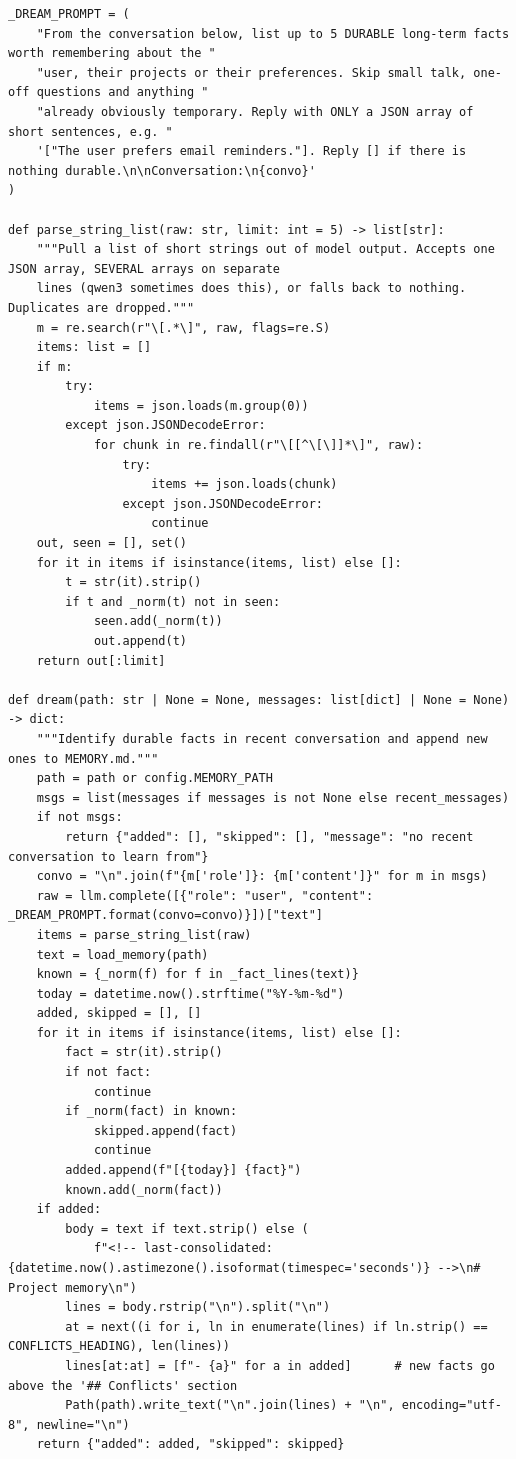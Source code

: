 \documentclass[11pt]{article}
\begin{document}
\begingroup\lstset{basicstyle=\ttfamily\scriptsize}
\begin{lstlisting}
_DREAM_PROMPT = (
    "From the conversation below, list up to 5 DURABLE long-term facts worth remembering about the "
    "user, their projects or their preferences. Skip small talk, one-off questions and anything "
    "already obviously temporary. Reply with ONLY a JSON array of short sentences, e.g. "
    '["The user prefers email reminders."]. Reply [] if there is nothing durable.\n\nConversation:\n{convo}'
)

def parse_string_list(raw: str, limit: int = 5) -> list[str]:
    """Pull a list of short strings out of model output. Accepts one JSON array, SEVERAL arrays on separate
    lines (qwen3 sometimes does this), or falls back to nothing. Duplicates are dropped."""
    m = re.search(r"\[.*\]", raw, flags=re.S)
    items: list = []
    if m:
        try:
            items = json.loads(m.group(0))
        except json.JSONDecodeError:
            for chunk in re.findall(r"\[[^\[\]]*\]", raw):
                try:
                    items += json.loads(chunk)
                except json.JSONDecodeError:
                    continue
    out, seen = [], set()
    for it in items if isinstance(items, list) else []:
        t = str(it).strip()
        if t and _norm(t) not in seen:
            seen.add(_norm(t))
            out.append(t)
    return out[:limit]

def dream(path: str | None = None, messages: list[dict] | None = None) -> dict:
    """Identify durable facts in recent conversation and append new ones to MEMORY.md."""
    path = path or config.MEMORY_PATH
    msgs = list(messages if messages is not None else recent_messages)
    if not msgs:
        return {"added": [], "skipped": [], "message": "no recent conversation to learn from"}
    convo = "\n".join(f"{m['role']}: {m['content']}" for m in msgs)
    raw = llm.complete([{"role": "user", "content": _DREAM_PROMPT.format(convo=convo)}])["text"]
    items = parse_string_list(raw)
    text = load_memory(path)
    known = {_norm(f) for f in _fact_lines(text)}
    today = datetime.now().strftime("%Y-%m-%d")
    added, skipped = [], []
    for it in items if isinstance(items, list) else []:
        fact = str(it).strip()
        if not fact:
            continue
        if _norm(fact) in known:
            skipped.append(fact)
            continue
        added.append(f"[{today}] {fact}")
        known.add(_norm(fact))
    if added:
        body = text if text.strip() else (
            f"<!-- last-consolidated: {datetime.now().astimezone().isoformat(timespec='seconds')} -->\n# Project memory\n")
        lines = body.rstrip("\n").split("\n")
        at = next((i for i, ln in enumerate(lines) if ln.strip() == CONFLICTS_HEADING), len(lines))
        lines[at:at] = [f"- {a}" for a in added]      # new facts go above the '## Conflicts' section
        Path(path).write_text("\n".join(lines) + "\n", encoding="utf-8", newline="\n")
    return {"added": added, "skipped": skipped}
\end{lstlisting}
\endgroup
\end{document}
